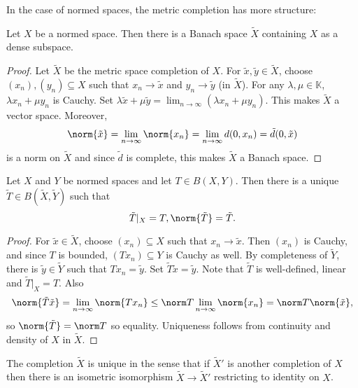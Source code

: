 \documentclass[a4paper]{article}
\newcommand{\K}{{\mathbb{K}}} %
\begin{document}
In the case of normed spaces, the metric completion has more structure:

\begin{theorem}
  Let \(X\) be a normed space. Then there is a Banach space \(\tilde X\) containing \(X\) as a dense subspace.
\end{theorem}

\begin{proof}
  Let \(\tilde X\) be the metric space completion of \(X\). For \(\tilde x, \tilde y \in \tilde X\), choose \((x_n), (y_n) \subseteq X\) such that \(x_n \to \tilde x\) and \(y_n \to \tilde y\) (in \(\tilde X\)). For any \(\lambda, \mu \in \K\), \(\lambda x_n + \mu y_n\) is Cauchy. Set \(\lambda \tilde x + \mu \tilde y = \lim_{n \to \infty} (\lambda x_n + \mu y_n)\). This makes \(\tilde X\) a vector space. Moreover,
  \[
    \norm{\tilde x} = \lim_{n \to \infty} \norm{x_n} = \lim_{n \to \infty} d(0, x_n) = \tilde d (0, \tilde x)
  \]
  is a norm on \(\tilde X\) and since \(\tilde d\) is complete, this makes \(\tilde X\) a Banach space.
\end{proof}

\begin{proposition}
  Let \(X\) and \(Y\) be normed spaces and let \(T \in B(X, Y)\). Then there is a unique \(\tilde T \in B(\tilde X, \tilde Y)\) such that
  \[
    \tilde T|_X = T, \norm{\tilde T} = \tilde T.
  \]
\end{proposition}

\begin{proof}
  For \(\tilde x \in \tilde X\), choose \((x_n) \subseteq X\) such that \(x_n \to \tilde x\). Then \((x_n)\) is Cauchy, and since \(T\) is bounded, \((Tx_n) \subseteq Y\) is Cauchy as well. By completeness of \(\tilde Y\), there is \(\tilde y \in \tilde Y\) such that \(Tx_n = \tilde y\). Set \(\tilde T \tilde x = \tilde y\). Note that \(\tilde T\) is well-defined, linear and \(\tilde T|_X = T\). Also
  \[
    \norm{\tilde T \tilde x} = \lim_{n \to \infty} \norm{T x_n} \leq \norm T \lim_{n \to \infty} \norm{x_n} = \norm T \norm{\tilde x},
  \]
  so \(\norm{\tilde T} = \norm T\) so equality. Uniqueness follows from continuity and density of \(X\) in \(\tilde X\).
\end{proof}

\begin{remark}
  The completion \(\tilde X\) is unique in the sense that if \(\tilde X'\) is another completion of \(X\) then there is an isometric isomorphism \(\tilde X \to \tilde X'\) restricting to identity on \(X\).
\end{remark}
\end{document}
